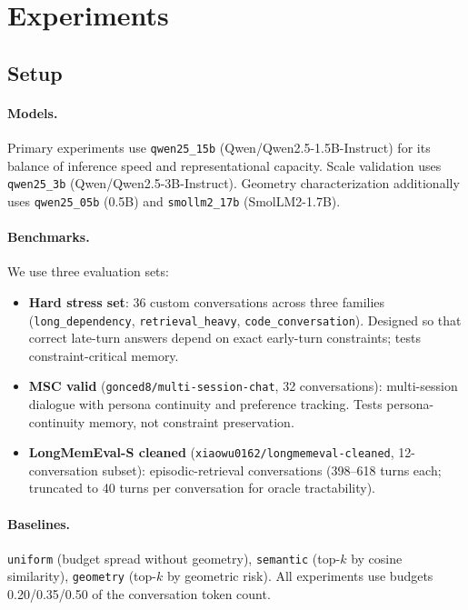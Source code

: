 \documentclass[conference]{IEEEtran}
\begin{document}
\section{Experiments}
\label{sec:experiments}

\subsection{Setup}

\paragraph{Models.}
Primary experiments use \texttt{qwen25\_15b} (Qwen/Qwen2.5-1.5B-Instruct) for
its balance of inference speed and representational capacity. Scale validation
uses \texttt{qwen25\_3b} (Qwen/Qwen2.5-3B-Instruct). Geometry characterization
additionally uses \texttt{qwen25\_05b} (0.5B) and \texttt{smollm2\_17b}
(SmolLM2-1.7B).

\paragraph{Benchmarks.}
We use three evaluation sets:
\begin{itemize}[leftmargin=1.4em]
\item \textbf{Hard stress set}: 36 custom conversations across three families
  (\texttt{long\_dependency}, \texttt{retrieval\_heavy}, \texttt{code\_conversation}).
  Designed so that correct late-turn answers depend on exact early-turn
  constraints; tests constraint-critical memory.
\item \textbf{MSC valid} (\texttt{gonced8/multi-session-chat}, 32 conversations):
  multi-session dialogue with persona continuity and preference tracking.
  Tests persona-continuity memory, not constraint preservation.
\item \textbf{LongMemEval-S cleaned} (\texttt{xiaowu0162/longmemeval-cleaned},
  12-conversation subset): episodic-retrieval conversations (398--618 turns
  each; truncated to 40 turns per conversation for oracle tractability).
\end{itemize}

\paragraph{Baselines.} \texttt{uniform} (budget spread without geometry),
\texttt{semantic} (top-$k$ by cosine similarity), \texttt{geometry} (top-$k$
by geometric risk). All experiments use budgets 0.20/0.35/0.50 of the
conversation token count.
\end{document}
